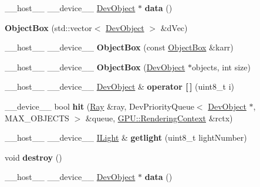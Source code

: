 \begin{DoxyCompactItemize}
\item 
\+\_\+\+\_\+host\+\_\+\+\_\+ \+\_\+\+\_\+device\+\_\+\+\_\+ \hyperlink{class_dev_object}{Dev\+Object} $\ast$ {\bfseries data} ()\hypertarget{class_object_box_ac5d2891a8048d7a80e4941c1235a5e9f}{}\label{class_object_box_ac5d2891a8048d7a80e4941c1235a5e9f}

\item 
{\bfseries Object\+Box} (std\+::vector$<$ \hyperlink{class_dev_object}{Dev\+Object} $>$ \&d\+Vec)\hypertarget{class_object_box_aafbc94494fbc8d4cdb62f8cb1f051003}{}\label{class_object_box_aafbc94494fbc8d4cdb62f8cb1f051003}

\item 
\+\_\+\+\_\+host\+\_\+\+\_\+ \+\_\+\+\_\+device\+\_\+\+\_\+ {\bfseries Object\+Box} (const \hyperlink{class_object_box}{Object\+Box} \&karr)\hypertarget{class_object_box_aa87628a92437a186a84efabb697a972f}{}\label{class_object_box_aa87628a92437a186a84efabb697a972f}

\item 
\+\_\+\+\_\+host\+\_\+\+\_\+ \+\_\+\+\_\+device\+\_\+\+\_\+ {\bfseries Object\+Box} (\hyperlink{class_dev_object}{Dev\+Object} $\ast$objects, int size)\hypertarget{class_object_box_af145281cc745ea12a7d323154d77a4a2}{}\label{class_object_box_af145281cc745ea12a7d323154d77a4a2}

\item 
\+\_\+\+\_\+host\+\_\+\+\_\+ \+\_\+\+\_\+device\+\_\+\+\_\+ \hyperlink{class_dev_object}{Dev\+Object} \& {\bfseries operator \mbox{[}$\,$\mbox{]}} (uint8\+\_\+t i)\hypertarget{class_object_box_aab4b56530190f6a452248e0a7547a76b}{}\label{class_object_box_aab4b56530190f6a452248e0a7547a76b}

\item 
\+\_\+\+\_\+device\+\_\+\+\_\+ bool {\bfseries hit} (\hyperlink{class_ray}{Ray} \&ray, Dev\+Priority\+Queue$<$ \hyperlink{class_dev_object}{Dev\+Object} $\ast$, M\+A\+X\+\_\+\+O\+B\+J\+E\+C\+TS $>$ \&queue, \hyperlink{struct_g_p_u_1_1_rendering_context}{G\+P\+U\+::\+Rendering\+Context} \&rctx)\hypertarget{class_object_box_a2414c6dfe6ea1f11fadbb37f96b9a463}{}\label{class_object_box_a2414c6dfe6ea1f11fadbb37f96b9a463}

\item 
\+\_\+\+\_\+host\+\_\+\+\_\+ \+\_\+\+\_\+device\+\_\+\+\_\+ \hyperlink{class_i_light}{I\+Light} \& {\bfseries getlight} (uint8\+\_\+t light\+Number)\hypertarget{class_object_box_a03450a7cc5c94af40e2416d72b0dfe69}{}\label{class_object_box_a03450a7cc5c94af40e2416d72b0dfe69}

\item 
void {\bfseries destroy} ()\hypertarget{class_object_box_ac5a98f92851297ed083ea54dd539d129}{}\label{class_object_box_ac5a98f92851297ed083ea54dd539d129}

\item 
\+\_\+\+\_\+host\+\_\+\+\_\+ \+\_\+\+\_\+device\+\_\+\+\_\+ \hyperlink{class_dev_object}{Dev\+Object} $\ast$ {\bfseries data} ()\hypertarget{class_object_box_a3838983908c17bea5c7659b464055f02}{}\label{class_object_box_a3838983908c17bea5c7659b464055f02}

\end{DoxyCompactItemize}
